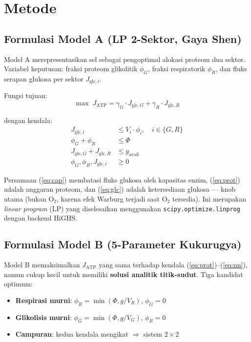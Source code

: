 \section{Metode}

\subsection{Formulasi Model A (LP 2-Sektor, Gaya Shen)}

Model A merepresentasikan sel sebagai pengoptimal alokasi proteom dua sektor.
Variabel keputusan: fraksi proteom glikolitik $\phi_G$, fraksi respiratorik
$\phi_R$, dan fluks serapan glukosa per sektor $J_{\text{glc},i}$.

Fungsi tujuan:
\begin{equation}
    \max \; J_\text{ATP} = \gamma_G \cdot J_{\text{glc},G} + \gamma_R \cdot J_{\text{glc},R}
    \label{eq:obj}
\end{equation}

dengan kendala:
\begin{align}
    J_{\text{glc},i} &\leq V_i \cdot \phi_i, \quad i \in \{G, R\} \label{eq:cap} \\
    \phi_G + \phi_R &\leq \Phi \label{eq:prot} \\
    J_{\text{glc},G} + J_{\text{glc},R} &\leq g_\text{avail} \label{eq:glc} \\
    \phi_G, \phi_R, J_{\text{glc},i} &\geq 0 \label{eq:nn}
\end{align}

Persamaan (\ref{eq:cap}) membatasi fluks glukosa oleh kapasitas enzim,
(\ref{eq:prot}) adalah anggaran proteom, dan (\ref{eq:glc}) adalah
ketersediaan glukosa --- knob utama (bukan O$_2$, karena efek Warburg
terjadi saat O$_2$ tersedia). Ini merupakan \textit{linear program} (LP)
yang diselesaikan menggunakan \texttt{scipy.optimize.linprog} dengan
backend HiGHS.

\subsection{Formulasi Model B (5-Parameter Kukurugya)}

Model B memaksimalkan $J_\text{ATP}$ yang sama terhadap kendala
(\ref{eq:prot})--(\ref{eq:nn}), namun cukup kecil untuk memiliki
\textbf{solusi analitik titik-sudut}. Tiga kandidat optimum:

\begin{itemize}
    \item \textbf{Respirasi murni}: $\phi_R = \min(\Phi, g/V_R)$, $\phi_G=0$
    \item \textbf{Glikolisis murni}: $\phi_G = \min(\Phi, g/V_G)$, $\phi_R=0$
    \item \textbf{Campuran}: kedua kendala mengikat $\Rightarrow$ sistem $2\times 2$
\end{itemize}

